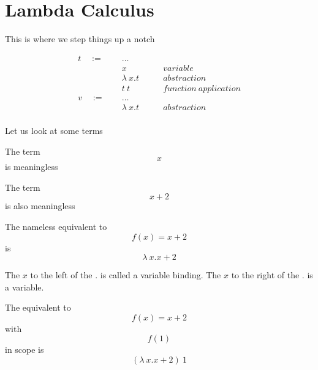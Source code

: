 
\section{Lambda Calculus}

\begin{frame}
  This is where we step things up a notch
\end{frame}

\begin{frame}
  \begin{mdframed}[frametitle={Terms and values}]
\begin{displaymath}
    \begin{aligned}
t \quad:=\quad& ~ \ldots &\\
  & ~ x \quad\quad &variable\\
  & ~ \lambda~x . t \quad\quad &abstraction\\
  & ~ t ~ t \quad\quad &function~application\\
v \quad:=\quad& ~ \ldots &\\
  & ~ \lambda~x . t \quad\quad &abstraction\\
    \end{aligned}
  \end{displaymath}
  \end{mdframed}
\end{frame}

\begin{frame}
  Let us look at some terms
\end{frame}

\begin{frame}
  The term
  \[x\]
  is meaningless
\end{frame}

\begin{frame}
  The term
  \[x + 2\]
  is also meaningless
\end{frame}

\begin{frame}
  The nameless equivalent to
  \[f(x) = x + 2\]
  is
  \[\lambda~x . x + 2\]
  \medskip
  \begin{overprint}
    The $x$ to the left of the $.$ is called a variable binding.
    The $x$ to the right of the $.$ is a variable.
  \end{overprint}
\end{frame}

\begin{frame}
  The equivalent to
  \[f(x) = x + 2\]
  with
  \[f(1)\]
   in scope  is
  \[(\lambda~x . x + 2)~1 \]
\end{frame}

